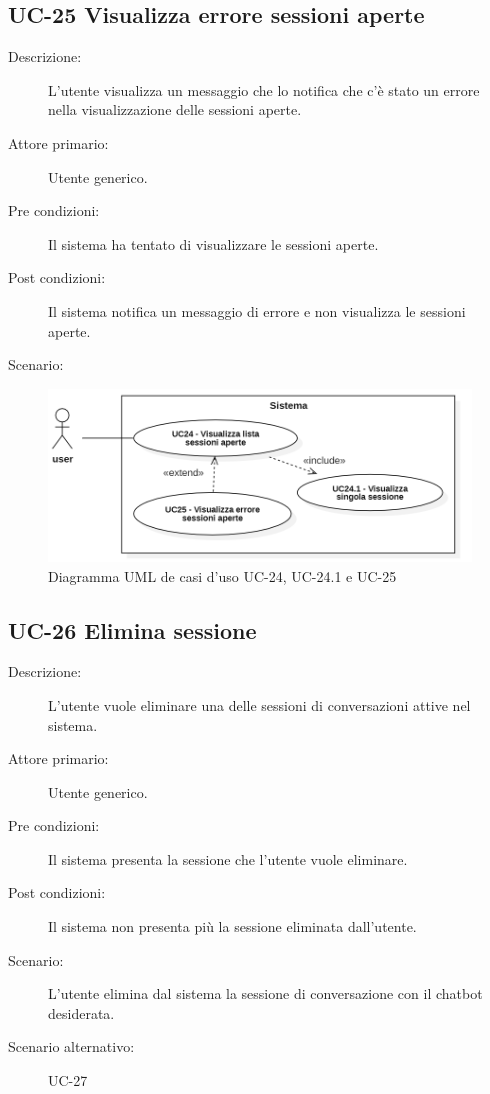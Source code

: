 \subsection{UC-25 Visualizza errore sessioni aperte }
\begin{description}
    \item[Descrizione:] L'utente visualizza un messaggio che lo notifica che c'è stato un errore nella visualizzazione delle sessioni aperte.
    \item[Attore primario:] Utente generico.
    \item[Pre condizioni:] Il sistema ha tentato di visualizzare le sessioni aperte.
    \item[Post condizioni:] Il sistema notifica un messaggio di errore e non visualizza le sessioni aperte.
    \item[Scenario:] 
\end{description}

\begin{figure}[H]
    \centering
    \includegraphics[width=0.8\linewidth]{UC24-25.PNG}
    \caption{Diagramma UML de casi d'uso UC-24, UC-24.1 e UC-25}
    \label{fig:UC24-25}
\end{figure}

\subsection{UC-26 Elimina sessione}
\begin{description}
    \item[Descrizione:] L'utente vuole eliminare una delle sessioni di conversazioni attive nel sistema.
    \item[Attore primario:] Utente generico.
    \item[Pre condizioni:] Il sistema presenta la sessione che l'utente vuole eliminare.
    \item[Post condizioni:] Il sistema non presenta più la sessione eliminata dall'utente.
    \item[Scenario:] L'utente elimina dal sistema la sessione di conversazione con il chatbot desiderata.
    \item[Scenario alternativo:] UC-27
\end{description}


